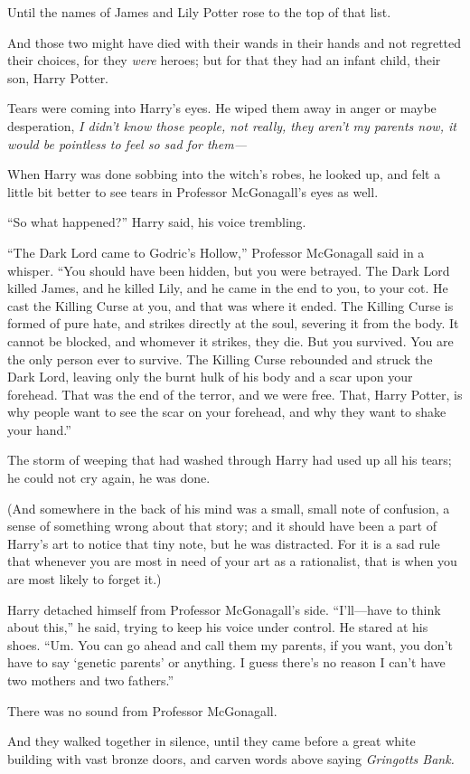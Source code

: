 Until the names of James and Lily Potter rose to the top of that list.

And those two might have died with their wands in their hands and not regretted their choices, for they \emph{were} heroes; but for that they had an infant child, their son, Harry Potter.

Tears were coming into Harry’s eyes. He wiped them away in anger or maybe desperation, \emph{I didn’t know those people, not really, they aren’t my parents \emph{now,} it would be pointless to feel so sad for them—}

When Harry was done sobbing into the witch’s robes, he looked up, and felt a little bit better to see tears in Professor McGonagall’s eyes as well.

“So what happened?” Harry said, his voice trembling.

“The Dark Lord came to Godric’s Hollow,” Professor McGonagall said in a whisper. “You should have been hidden, but you were betrayed. The Dark Lord killed James, and he killed Lily, and he came in the end to you, to your cot. He cast the Killing Curse at you, and that was where it ended. The Killing Curse is formed of pure hate, and strikes directly at the soul, severing it from the body. It cannot be blocked, and whomever it strikes, they die. But you survived. You are the only person ever to survive. The Killing Curse rebounded and struck the Dark Lord, leaving only the burnt hulk of his body and a scar upon your forehead. That was the end of the terror, and we were free. That, Harry Potter, is why people want to see the scar on your forehead, and why they want to shake your hand.”

The storm of weeping that had washed through Harry had used up all his tears; he could not cry again, he was done.

(And somewhere in the back of his mind was a small, small note of confusion, a sense of something wrong about that story; and it should have been a part of Harry’s art to notice that tiny note, but he was distracted. For it is a sad rule that whenever you are most in need of your art as a rationalist, that is when you are most likely to forget it.)

Harry detached himself from Professor McGonagall’s side. “I’ll—have to think about this,” he said, trying to keep his voice under control. He stared at his shoes. “Um. You can go ahead and call them my parents, if you want, you don’t have to say ‘genetic parents’ or anything. I guess there’s no reason I can’t have two mothers and two fathers.”

There was no sound from Professor McGonagall.

And they walked together in silence, until they came before a great white building with vast bronze doors, and carven words above saying \emph{Gringotts Bank.}


